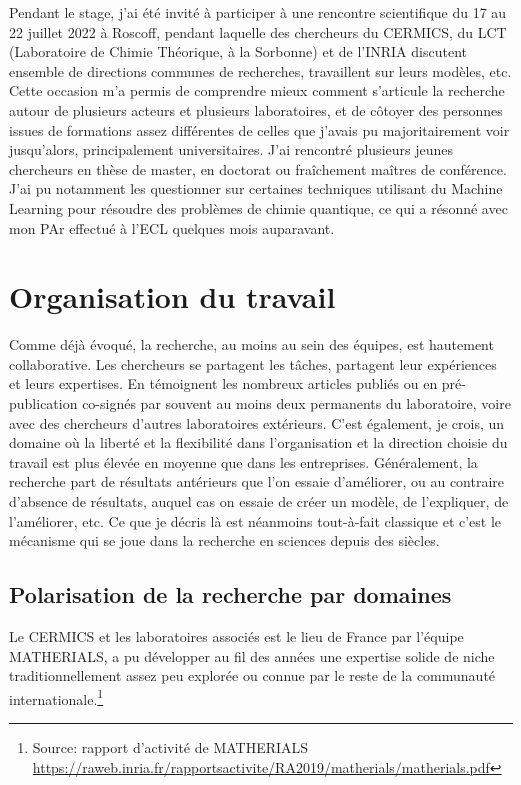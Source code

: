 \documentclass[svgnames,dvipsnames,a4paper,10pt,french]{report}
\begin{document}
Pendant le stage, j'ai été invité à participer à une rencontre scientifique du 17 au 22 juillet 2022 à Roscoff, pendant laquelle des chercheurs du CERMICS, du LCT (Laboratoire de Chimie Théorique, à la Sorbonne) et de l'INRIA discutent ensemble de directions communes de recherches, travaillent sur leurs modèles, etc.  Cette occasion m'a permis de comprendre mieux comment s'articule la recherche autour de plusieurs acteurs et plusieurs laboratoires, et de côtoyer des personnes issues de formations assez différentes de celles que j'avais pu majoritairement voir jusqu'alors, principalement universitaires. J'ai rencontré plusieurs jeunes chercheurs en thèse de master, en doctorat ou fraîchement maîtres de conférence. J'ai pu notamment les questionner sur certaines techniques utilisant du Machine Learning pour résoudre des problèmes de chimie quantique, ce qui a résonné avec mon PAr effectué à l'ECL quelques mois auparavant. 

\section{Organisation du travail}

Comme déjà évoqué, la recherche, au moins au sein des équipes, est hautement collaborative. Les chercheurs se partagent les tâches, partagent leur expériences et leurs expertises. En témoignent les nombreux articles publiés ou en pré-publication co-signés par souvent au moins deux permanents du laboratoire, voire avec des chercheurs d'autres laboratoires extérieurs. C'est également, je crois, un domaine où la liberté et la flexibilité dans l'organisation et la direction choisie du travail est plus élevée en moyenne que dans les entreprises. Généralement, la recherche part de résultats antérieurs que l'on essaie d'améliorer, ou au contraire d'absence de résultats, auquel cas on essaie de créer un modèle, de l'expliquer, de l'améliorer, etc. Ce que je décris là est néanmoins tout-à-fait classique et c'est le mécanisme qui se joue dans la recherche en sciences depuis des siècles.

\subsection{Polarisation de la recherche par domaines}
Le CERMICS et les laboratoires associés est le lieu de France par l'équipe MATHERIALS, a pu développer au fil des années une expertise solide \og de niche \fg{} traditionnellement assez peu explorée ou connue par le reste de la communauté internationale.\footnote{Source: rapport d'activité de MATHERIALS \url{https://raweb.inria.fr/rapportsactivite/RA2019/matherials/matherials.pdf}}
\end{document}
